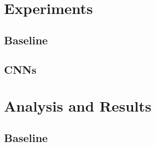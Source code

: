 \documentclass{article}
\theoremstyle{definition}
\theoremstyle{remark}
\begin{document}
\section{Experiments}


\subsection{Baseline}



\subsection{CNNs}



\section{Analysis and Results}

\subsection{Baseline}
\end{document}

